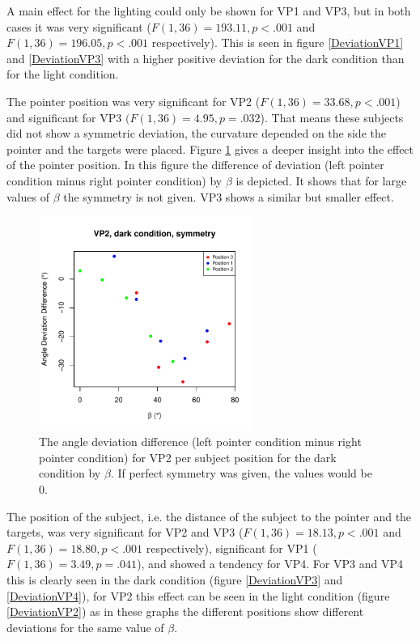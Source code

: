 A main effect for the lighting could only be shown for VP1 and VP3, but in both cases it was very significant ($F(1,36) = 193.11, p < .001$ and $F(1,36) = 196.05, p < .001$ respectively). This is seen in figure \ref{DeviationVP1} and \ref{DeviationVP3} with a higher positive deviation for the dark condition than for the light condition.

The pointer position was very significant for VP2 ($F(1,36) = 33.68, p < .001$) and significant for VP3 $(F(1,36) = 4.95, p = .032$). That means these subjects did not show a symmetric deviation, the curvature depended on the side the pointer and the targets were placed. Figure \ref{VP2Symmetry} gives a deeper insight into the effect of the pointer position. %
In this figure the difference of deviation (left pointer condition minus right pointer condition) by $\beta$ is depicted. It shows that for large values of $\beta$ the symmetry is not given. VP3 shows a similar but smaller effect. %

\begin{figure}
    \centering
    \includegraphics[width=7cm]{Images/plots/VP2Symmetry.pdf}
    \caption{The angle deviation difference (left pointer condition minus right pointer condition) for VP2 per subject position for the dark condition by $\beta$. If perfect symmetry was given, the values would be 0.}
    \label{VP2Symmetry}
\end{figure}

The position of the subject, i.e. the distance of the subject to the pointer and the targets, was very significant for VP2 and VP3 ($F(1,36) = 18.13, p < .001$ and $F(1,36) = 18.80, p < .001$ respectively), significant for VP1 ($F(1,36) = 3.49, p = .041$), and showed a tendency for VP4. For VP3 and VP4 this is clearly seen in the dark condition (figure \ref{DeviationVP3} and \ref{DeviationVP4}), for VP2 this effect can be seen in the light condition (figure \ref{DeviationVP2}) as in these graphs the different positions show different deviations for the same value of $\beta$.

